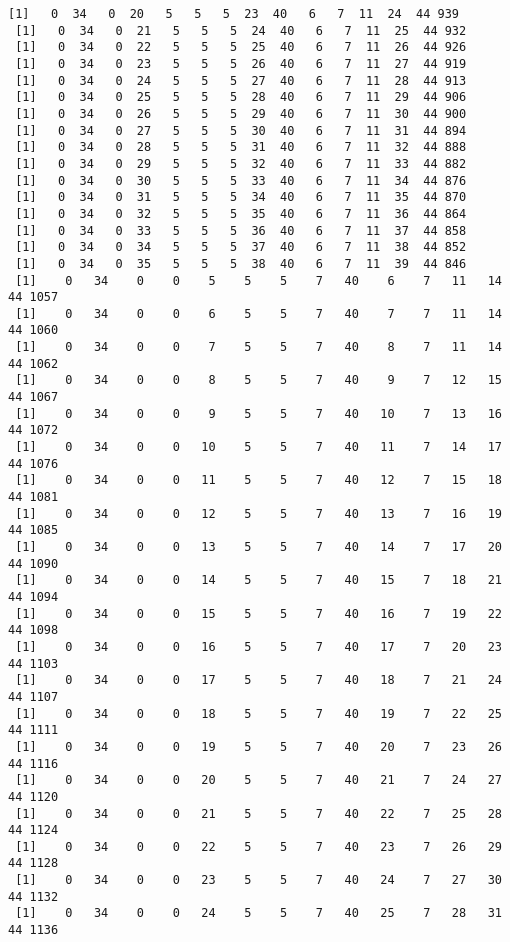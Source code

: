 \documentclass[11pt]{article}
\begin{document}
\begin{Verbatim}[commandchars=\\\{\}]
 [1]   0  34   0  20   5   5   5  23  40   6   7  11  24  44 939
 [1]   0  34   0  21   5   5   5  24  40   6   7  11  25  44 932
 [1]   0  34   0  22   5   5   5  25  40   6   7  11  26  44 926
 [1]   0  34   0  23   5   5   5  26  40   6   7  11  27  44 919
 [1]   0  34   0  24   5   5   5  27  40   6   7  11  28  44 913
 [1]   0  34   0  25   5   5   5  28  40   6   7  11  29  44 906
 [1]   0  34   0  26   5   5   5  29  40   6   7  11  30  44 900
 [1]   0  34   0  27   5   5   5  30  40   6   7  11  31  44 894
 [1]   0  34   0  28   5   5   5  31  40   6   7  11  32  44 888
 [1]   0  34   0  29   5   5   5  32  40   6   7  11  33  44 882
 [1]   0  34   0  30   5   5   5  33  40   6   7  11  34  44 876
 [1]   0  34   0  31   5   5   5  34  40   6   7  11  35  44 870
 [1]   0  34   0  32   5   5   5  35  40   6   7  11  36  44 864
 [1]   0  34   0  33   5   5   5  36  40   6   7  11  37  44 858
 [1]   0  34   0  34   5   5   5  37  40   6   7  11  38  44 852
 [1]   0  34   0  35   5   5   5  38  40   6   7  11  39  44 846
 [1]    0   34    0    0    5    5    5    7   40    6    7   11   14   44 1057
 [1]    0   34    0    0    6    5    5    7   40    7    7   11   14   44 1060
 [1]    0   34    0    0    7    5    5    7   40    8    7   11   14   44 1062
 [1]    0   34    0    0    8    5    5    7   40    9    7   12   15   44 1067
 [1]    0   34    0    0    9    5    5    7   40   10    7   13   16   44 1072
 [1]    0   34    0    0   10    5    5    7   40   11    7   14   17   44 1076
 [1]    0   34    0    0   11    5    5    7   40   12    7   15   18   44 1081
 [1]    0   34    0    0   12    5    5    7   40   13    7   16   19   44 1085
 [1]    0   34    0    0   13    5    5    7   40   14    7   17   20   44 1090
 [1]    0   34    0    0   14    5    5    7   40   15    7   18   21   44 1094
 [1]    0   34    0    0   15    5    5    7   40   16    7   19   22   44 1098
 [1]    0   34    0    0   16    5    5    7   40   17    7   20   23   44 1103
 [1]    0   34    0    0   17    5    5    7   40   18    7   21   24   44 1107
 [1]    0   34    0    0   18    5    5    7   40   19    7   22   25   44 1111
 [1]    0   34    0    0   19    5    5    7   40   20    7   23   26   44 1116
 [1]    0   34    0    0   20    5    5    7   40   21    7   24   27   44 1120
 [1]    0   34    0    0   21    5    5    7   40   22    7   25   28   44 1124
 [1]    0   34    0    0   22    5    5    7   40   23    7   26   29   44 1128
 [1]    0   34    0    0   23    5    5    7   40   24    7   27   30   44 1132
 [1]    0   34    0    0   24    5    5    7   40   25    7   28   31   44 1136

\end{Verbatim}
\end{document}
